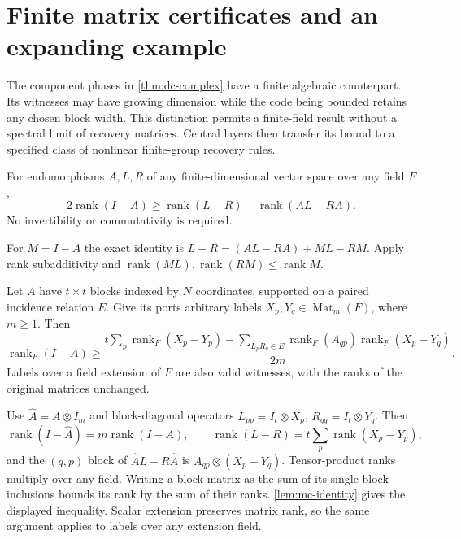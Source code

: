 \section{Finite matrix certificates and an expanding example}
\label{sec:mc-section}

The component phases in \cref{thm:dc-complex} have a finite algebraic
counterpart.  Its witnesses may have growing dimension while the code
being bounded retains any chosen block width.  This distinction permits
a finite-field result without a spectral limit of recovery matrices.
Central layers then transfer its bound to a specified class of nonlinear
finite-group recovery rules.

\begin{lemma}
\label{lem:mc-identity}
For endomorphisms $A,L,R$ of any finite-dimensional vector space over any
field $F$,
\begin{equation}
 2\operatorname{rank}(I-A)
 \ge\operatorname{rank}(L-R)-\operatorname{rank}(AL-RA).
 \label{eq:mc-rank-identity}
\end{equation}
No invertibility or commutativity is required.
\end{lemma}
\begin{outline}
For $M=I-A$ the exact identity is
$L-R=(AL-RA)+ML-RM$.  Apply rank subadditivity and
$\operatorname{rank}(ML),\operatorname{rank}(RM)\le\operatorname{rank}M$.
\end{outline}

\begin{proposition}
\label{prop:mc-certificate}
Let $A$ have $t\times t$ blocks indexed by $N$ coordinates, supported on
a paired incidence relation $E$.  Give its ports arbitrary labels
$X_p,Y_q\in\operatorname{Mat}_m(F)$, where $m\ge1$.  Then
\begin{equation}
 \operatorname{rank}_F(I-A)\ge
 \frac{t\sum_{p}\operatorname{rank}_F(X_p-Y_p)
 -\sum_{L_pR_q\in E}\operatorname{rank}_F(A_{qp})
                         \operatorname{rank}_F(X_p-Y_q)}{2m}.
 \label{eq:mc-certificate-equation}
\end{equation}
Labels over a field extension of $F$ are also valid witnesses, with
the ranks of the original matrices unchanged.
\end{proposition}
\begin{outline}
Use $\widehat A=A\otimes I_m$ and block-diagonal operators
$L_{pp}=I_t\otimes X_p$, $R_{qq}=I_t\otimes Y_q$.
Then
\[
 \operatorname{rank}(I-\widehat A)=m\operatorname{rank}(I-A),\qquad
 \operatorname{rank}(L-R)=t\sum_p\operatorname{rank}(X_p-Y_p),
\]
and the $(q,p)$ block of $\widehat A L-R\widehat A$ is
$A_{qp}\otimes(X_p-Y_q)$.  Tensor-product ranks multiply over any field.
Writing a block matrix as the sum of its single-block inclusions bounds
its rank by the sum of their ranks.  \cref{lem:mc-identity} gives the
displayed inequality. Scalar extension preserves matrix rank, so the same
argument applies to labels over any extension field.
\end{outline}

